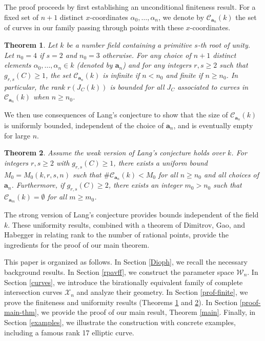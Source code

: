 \documentclass[11pt, a4paper]{amsart}
\newtheorem{thm}{Theorem}[section]
\theoremstyle{definition}
\newcommand{\Cc}{\mathcal{C}}
\newcommand{\Wc}{\mathcal{W}}
\newcommand{\Xc}{\mathcal{X}}
\newcommand{\ba}{\mathbf{a}}
\begin{document}
The proof proceeds by first establishing an unconditional finiteness result. For a fixed set of $n+1$ distinct $x$-coordinates $\alpha_0, \dots, \alpha_n$, we denote by $\Cc_{\ba_n}(k)$ the set of curves in our family passing through points with these $x$-coordinates.

\begin{thm} \label{main1}
	Let $k$ be a number field containing a primitive $s$-th root of unity. Let $n_0=4$ if $s=2$ and $n_0=3$ otherwise. For any choice of $n+1$ distinct elements $\alpha_0, \ldots, \alpha_n \in k$ (denoted by $\ba_n$) and for any integers $r, s \geq 2$ such that $g_{r,s}(C) \geq 1$, the set $\Cc_{\ba_n}(k)$ is infinite if $n < n_0$ and finite if $n \geq n_0$. In particular, the rank $r(J_C(k))$ is bounded for all $J_C$ associated to curves in $\Cc_{\ba_n}(k)$ when $n \geq n_0$.
\end{thm}

We then use consequences of Lang's conjecture to show that the size of $\Cc_{\ba_n}(k)$ is uniformly bounded, independent of the choice of $\ba_n$, and is eventually empty for large $n$.

\begin{thm} \label{main2}
	Assume the weak version of Lang's conjecture holds over $k$. For integers $r, s \geq 2$ with $g_{r,s}(C) \geq 1$, there exists a uniform bound $M_0 = M_0(k, r, s, n)$ such that $\#\Cc_{\ba_n}(k) < M_0$ for all $n \geq n_0$ and all choices of $\ba_n$. Furthermore, if $g_{r,s}(C) \geq 2$, there exists an integer $m_0 > n_0$ such that $\Cc_{\ba_m}(k) = \emptyset$ for all $m \geq m_0$.
\end{thm}

The strong version of Lang's conjecture provides bounds independent of the field $k$. These uniformity results, combined with a theorem of Dimitrov, Gao, and Habegger in \cite{Dimitrov2021} relating rank to the number of rational points, provide the ingredients for the proof of our main theorem.

This paper is organized as follows. In Section \ref{Dioph}, we recall the necessary background results. In Section \ref{rpavff}, we construct the parameter space $\Wc_n$. In Section \ref{curves}, we introduce the birationally equivalent family of complete intersection curves $\Xc_n$ and analyze their geometry. In Section \ref{prof-finite}, we prove the finiteness and uniformity results (Theorems \ref{main1} and \ref{main2}). In Section \ref{proof-main-thm}, we provide the proof of our main result, Theorem \ref{main}. Finally, in Section \ref{examples}, we illustrate the construction with concrete examples, including a famous rank 17 elliptic curve.
\end{document}
